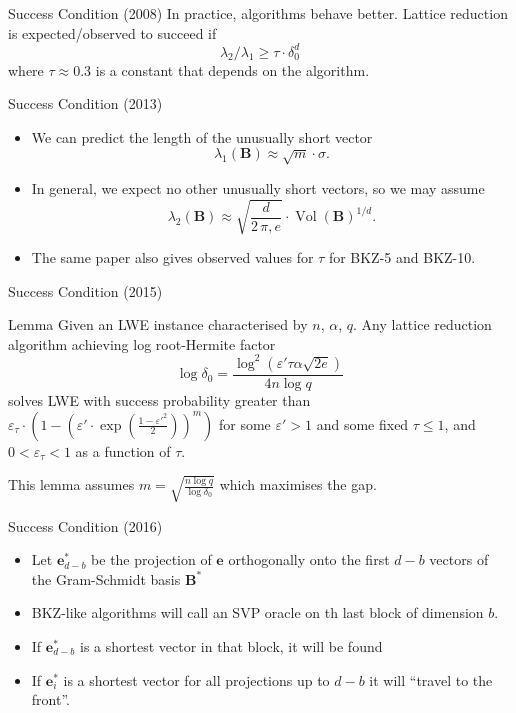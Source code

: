 \documentclass[presentation,smaller]{beamer}
\renewcommand{\vec}[1]{\mathbf{#1}\xspace}
\newcommand{\mat}[1]{\mathbf{#1}\xspace}
\DeclareMathOperator{\Vol}{Vol}
\begin{document}
\begin{frame}[label={sec:org92384cc}]{Success Condition (2008)}
In practice, algorithms behave better. Lattice reduction is expected/observed  to succeed if \[λ_2/λ_1 ≥ τ ⋅ δ_0^d\] where \(τ ≈ 0.3\) is a constant that depends on the algorithm.
\end{frame}

\begin{frame}[label={sec:org396ee36}]{Success Condition (2013)}
\begin{itemize}
\item We can predict the length of the unusually short vector \[λ_1(\vec{B}) ≈ \sqrt{m} ⋅ σ.\]

\item In general, we expect no other unusually short vectors, so we may assume  \[λ_2(\vec{B}) ≈ \sqrt{\frac{d}{2\,π,e}} ⋅ \Vol(\vec{B})^{1/d}.\]

\item The same paper also gives observed values for \(τ\) for BKZ-5 and BKZ-10.
\end{itemize}
\end{frame}

\begin{frame}[label={sec:org9d577a2}]{Success Condition (2015)}
\begin{block}{Lemma }
Given an LWE instance characterised by \(n\), \(α\), \(q\). Any lattice reduction algorithm achieving log root-Hermite factor \[\log{δ_0} = \frac{\log^2{\left(ε' τ α \sqrt{2e}\right)}}{4 n \log{q}}\] solves LWE with success probability greater than \(ε_τ ⋅ \left( 1-\left(ε' ⋅  \exp{\left(\frac{1-ε'^2}{2}\right)}\right)^m \right)\) for some \(ε' > 1\) and some fixed \(τ ≤ 1\), and \(0 < ε_τ < 1\) as a function of \(τ\).
\end{block}

This lemma assumes \(m = \sqrt{\frac{n \log q}{\log δ_0}}\) which maximises the gap.
\end{frame}

\begin{frame}[label={sec:orgeeb4388}]{Success Condition (2016)}
\begin{itemize}
\item Let \(\vec{e}^*_{d-b}\) be the projection of \(\vec{e}\) orthogonally onto the first \(d-b\) vectors of the Gram-Schmidt basis \(\mat{B}^*\)
\item BKZ-like algorithms will call an SVP oracle on th last block of dimension \(b\).
\item If \(\vec{e}^*_{d-b}\) is a shortest vector in that block, it will be found
\item If \(\vec{e}^*_i\) is a shortest vector for all projections up to \(d-b\) it will “travel to the front”.
\end{itemize}
\end{frame}
\end{document}
